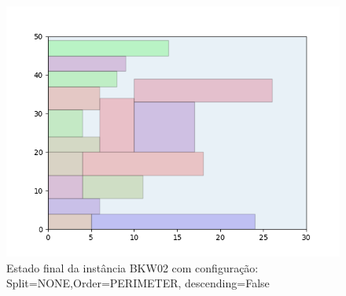 \begin{figure}[H]
    \centering
    \caption[]{Estado final da instância BKW02 com configuração: Split=NONE,Order=PERIMETER, descending=False}
    \label{fig:bkw02-none-perimeter-false}
    \includegraphics[scale=0.5]{output/figures/bkw/bkw02/none/perimeter/false/00}
\end{figure}